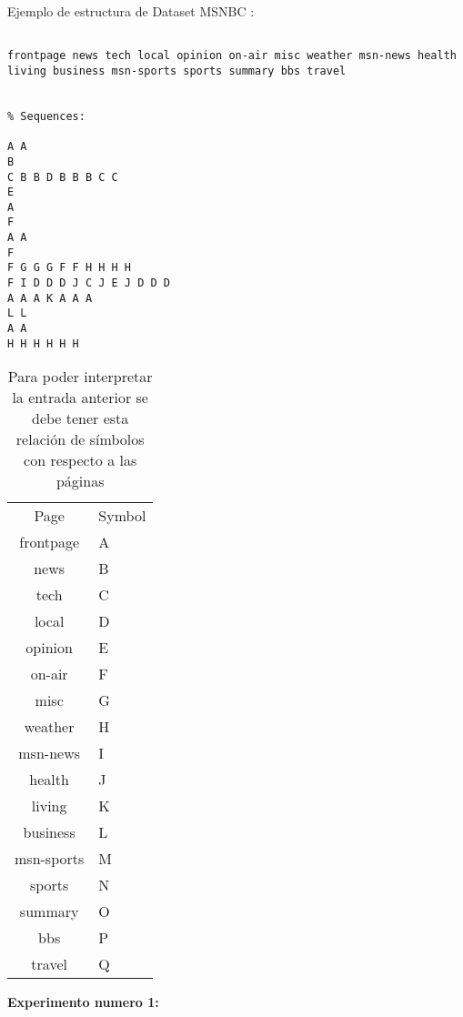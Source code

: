 Ejemplo de estructura de Dataset MSNBC :
\vspace{1cm}

\begin{lstlisting}[frame=single,basicstyle=\ttfamily\tiny,]
% Different categories found in input file:

frontpage news tech local opinion on-air misc weather msn-news health living business msn-sports sports summary bbs travel


% Sequences:

A A 
B 
C B B D B B B C C 
E 
A 
F 
A A 
F 
F G G G F F H H H H 
F I D D D J C J E J D D D 
A A A K A A A 
L L 
A A 
H H H H H H 
\end{lstlisting}



\begin{table}[]
	\centering
	\caption{Para poder interpretar la entrada anterior se debe tener esta relación de símbolos con respecto a las páginas}
	\label{my-label}
	\begin{tabular}{cl}
		Page       & Symbol \\ \cline{1-2}
		frontpage  & A      \\
		news       & B      \\
		tech       & C      \\
		local      & D      \\
		opinion    & E      \\
		on-air     & F      \\
		misc       & G      \\
		weather    & H      \\
		msn-news   & I      \\
		health     & J      \\
		living     & K      \\
		business   & L      \\
		msn-sports & M      \\
		sports     & N      \\
		summary    & O      \\
		bbs        & P      \\
		travel     & Q      \\ 
	\end{tabular}
\end{table}







\textbf{Experimento numero 1:} 
\newline

